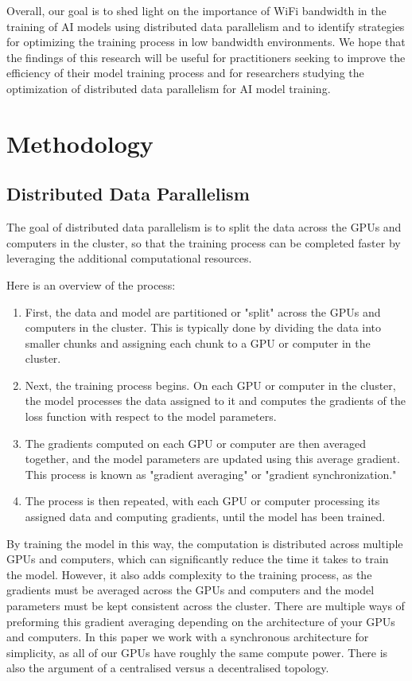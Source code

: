 \documentclass[11pt]{article}
\begin{document}
Overall, our goal is to shed light on the importance of WiFi bandwidth in the training of AI models using distributed data parallelism and to identify strategies for optimizing the training process in low bandwidth environments. We hope that the findings of this research will be useful for practitioners seeking to improve the efficiency of their model training process and for researchers studying the optimization of distributed data parallelism for AI model training.

\section{Methodology}
\subsection{Distributed Data Parallelism}
The goal of distributed data parallelism is to split the data across the GPUs and computers in the cluster, so that the training process can be completed faster by leveraging the additional computational resources.

Here is an overview of the process:

\begin{enumerate}
	\item First, the data and model are partitioned or "split" across the GPUs and computers in 			  the cluster. This is typically done by dividing the data into smaller chunks and 	  				   assigning each chunk to a GPU or computer in the cluster.
	\item Next, the training process begins. On each GPU or computer in the cluster, the model 				  processes the data assigned to it and computes the gradients of the loss function with 		  respect to the model parameters.
	\newpage
	\item The gradients computed on each GPU or computer are then averaged together, and the 				  model parameters are updated using this average gradient. This process is known as 				  "gradient averaging" or "gradient synchronization."
	\item The process is then repeated, with each GPU or computer processing its assigned data 				  and computing gradients, until the model has been trained.
\end{enumerate}

By training the model in this way, the computation is distributed across multiple GPUs and computers, which can significantly reduce the time it takes to train the model. However, it also adds complexity to the training process, as the gradients must be averaged across the GPUs and computers and the model parameters must be kept consistent across the cluster. There are multiple ways of preforming this gradient averaging depending on the architecture of your GPUs and computers. In this paper we work with a synchronous architecture for simplicity, as all of our GPUs have roughly the same compute power. There is also the argument of a centralised versus a decentralised topology.
\end{document}

